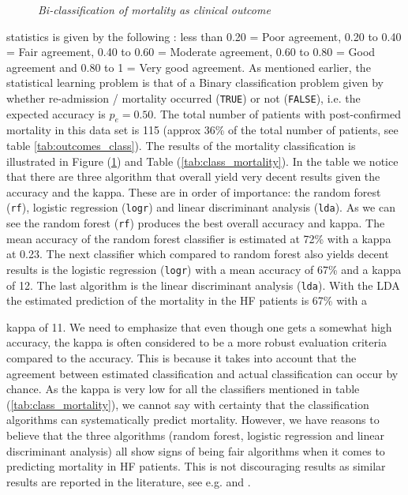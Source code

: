 \documentclass[../thesis.tex]{subfiles}
\begin{document}
\begin{figure}[h!]
    \centering
    \scalebox{.8}{}
    \caption[Bi-classification of mortality as clinical outcome]{\textit{Bi-classification of mortality as clinical outcome}}
    \label{fig:bi_class_mort}
\end{figure}

\newpage
\noindent statistics is given by the following \citep{ashby1991practical}: less than 0.20 = Poor agreement, 0.20 to 0.40 = Fair agreement, 0.40 to 0.60 = Moderate agreement, 0.60 to 0.80 = Good agreement and 0.80 to 1 = Very good agreement. As mentioned earlier, the statistical learning problem is that of a Binary classification problem given by whether  re-admission / mortality occurred (\texttt{TRUE}) or not (\texttt{FALSE}), i.e. the expected accuracy is $p_e = 0.50$. The total number of patients with post-confirmed mortality in this data set is 115 (approx 36\% of the total number of patients, see table \ref{tab:outcomes_class}). The results of the mortality classification is illustrated in Figure (\ref{fig:bi_class_mort}) and Table (\ref{tab:class_mortality}). In the table we notice that there are three algorithm that overall yield very decent results given the accuracy and the kappa. These are in order of importance: the random forest (\texttt{rf}), logistic regression (\texttt{logr}) and linear discriminant analysis (\texttt{lda}). As we can see the random forest (\texttt{rf}) \citep{ho1995random} produces the best overall accuracy and kappa. The mean accuracy of the random forest classifier is estimated at 72\% with a kappa at 0.23. The next classifier which compared to random forest also yields decent results is the logistic regression (\texttt{logr}) with a mean accuracy of 67\% and a kappa of 12. The last algorithm is the linear discriminant analysis (\texttt{lda}). With the LDA the estimated prediction of the mortality in the HF patients is 67\% with a 


\newpage
\noindent kappa of 11. We need to emphasize that even though one gets a somewhat high accuracy, the kappa is often considered to be a more robust evaluation criteria compared to the accuracy. This is because it takes into account that the agreement between estimated classification and actual classification can occur by chance. As the kappa is very low for all the classifiers mentioned in table (\ref{tab:class_mortality}), we cannot say with certainty that the classification algorithms can systematically predict mortality. However, we have reasons to believe that the three algorithms (random forest, logistic regression and linear discriminant analysis) all show signs of being fair algorithms when it comes to predicting mortality in HF patients. This is not discouraging results as similar results are reported in the literature, see e.g. \cite{shah2014phenomapping} and \cite{panahiazar2015using}.
\end{document}
